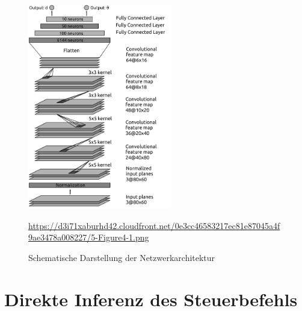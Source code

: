 \begin{figure}[H]
	\centering
	\includegraphics[width=0.56\textwidth]{kapitel4/images/network_architecture.png}
	\caption{Schematische Darstellung der Netzwerkarchitektur}
	\label{network-architecture}
	\vspace{0.2cm}
	\quelle\url{https://d3i71xaburhd42.cloudfront.net/0e3cc46583217ec81e87045a4f9ae3478a008227/5-Figure4-1.png}
\end{figure}

\section{Direkte Inferenz des Steuerbefehls}




